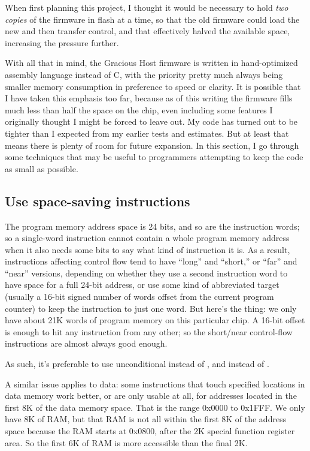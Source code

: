 When first planning this project, I thought it would be necessary to hold
\emph{two copies} of the firmware in flash at a time, so that the old
firmware could load the new and then transfer control, and that effectively
halved the available space, increasing the pressure further.

With all that in mind, the Gracious Host firmware is written in
hand-optimized assembly language instead of C, with the priority pretty much
always being smaller memory consumption in preference to speed or clarity. 
It is possible that I have taken this emphasis too far, because as of this
writing the firmware fills much less than half the space on the chip, even
including some features I originally thought I might be forced to leave out. 
My code has turned out to be tighter than I expected from my earlier tests
and estimates.  But at least that means there is plenty of room for future
expansion.  In this section, I go through some techniques that may be useful
to programmers attempting to keep the code as small as possible.

\subsection{Use space-saving instructions}

The program memory address space is 24 bits, and so are the instruction
words; so a single-word instruction cannot contain a whole program memory
address when it also needs some bits to say what kind of instruction it is. 
As a result, instructions affecting control flow tend to have ``long'' and
``short,'' or ``far'' and ``near'' versions, depending on whether they use a
second instruction word to have space for a full 24-bit address, or use some
kind of abbreviated target (usually a 16-bit signed number of words offset
from the current program counter) to keep the instruction to just one word. 
But here's the thing:  we only have about 21K words of program memory on this
particular chip.  A 16-bit offset is enough to hit any instruction from any
other; so the short/near control-flow instructions are almost always good
enough.

As such, it's preferable to use unconditional  instead of
, and  instead of .

A similar issue applies to data:  some instructions that touch specified
locations in data memory work better, or are only usable at all, for
addresses located in the first 8K of the data memory space.  That is the
range 0x0000 to 0x1FFF.  We only have 8K of RAM, but that RAM is not
all within the first 8K of the address space because the RAM starts at 0x0800,
after the 2K special function register area.  So the first 6K of RAM is more
accessible than the final 2K.

